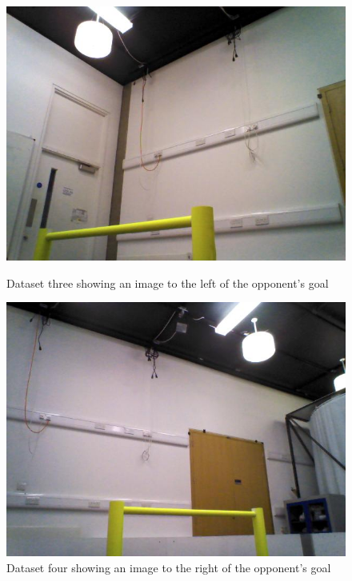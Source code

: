\documentclass{article}
\begin{document}
\begin{figure}[h!]
\begin{minipage}[b]{0.5\linewidth}
\includegraphics[scale=0.5]{../Drawings/datasetImages/ogLeft.jpg}
\caption{Dataset three showing an image to the left of the opponent's goal}
\label{fig:dataset3}
\end{minipage}
\hspace{0.5cm}
\begin{minipage}[b]{0.5\linewidth}
\includegraphics[scale=0.5]{../Drawings/datasetImages/ogRight.jpg}
\caption{Dataset four showing an image to the right of the opponent's goal}
\label{fig:dataset4}
\end{minipage}
\end{figure}
\end{document}
